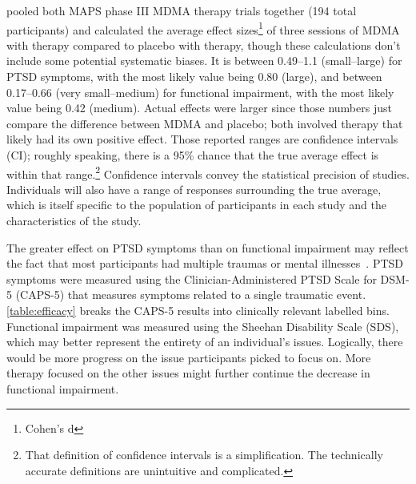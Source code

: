 \documentclass[11pt,oneside]{book}
\let\cite\parencite
\begin{document}
\textcite{icerReport} pooled both MAPS phase III MDMA therapy trials together (194 total participants) and calculated the average effect sizes\footnote{Cohen's d} of three sessions of MDMA with therapy compared to placebo with therapy, though these calculations don't include some potential systematic biases. It is between 0.49--1.1 (small--large) for PTSD symptoms, with the most likely value being 0.80 (large), and between 0.17--0.66 (very small--medium) for functional impairment, with the most likely value being 0.42 (medium). Actual effects were larger since those numbers just compare the difference between MDMA and placebo; both involved therapy that likely had its own positive effect. Those reported ranges are confidence intervals (CI); roughly speaking, there is a 95\% chance that the true average effect is within that range.\footnote{That definition of confidence intervals is a simplification. The technically accurate definitions are unintuitive and complicated.} Confidence intervals convey the statistical precision of studies. Individuals will also have a range of responses surrounding the true average, which is itself specific to the population of participants in each study and the characteristics of the study.

The greater effect on PTSD symptoms than on functional impairment may reflect the fact that most participants had multiple traumas or mental illnesses~\cite{mitchellMDMAClinicalTrial,mitchellMDMAClinicalTrial2}. PTSD symptoms were measured using the Clinician-Administered PTSD Scale for DSM-5 (CAPS-5) that measures symptoms related to a single traumatic event. \cref{table:efficacy} breaks the CAPS-5 results into clinically relevant labelled bins. Functional impairment was measured using the Sheehan Disability Scale (SDS), which may better represent the entirety of an individual's issues. Logically, there would be more progress on the issue participants picked to focus on. More therapy focused on the other issues might further continue the decrease in functional impairment.
\end{document}
